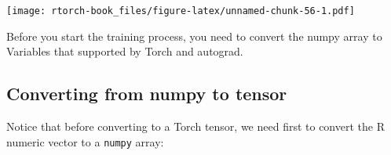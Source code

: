 \documentclass[]{book}
\newenvironment{Shaded}{\begin{snugshade}}{\end{snugshade}}
\newcommand{\CommentTok}[1]{\textcolor[rgb]{0.56,0.35,0.01}{\textit{#1}}}
\newcommand{\KeywordTok}[1]{\textcolor[rgb]{0.13,0.29,0.53}{\textbf{#1}}}
\newcommand{\NormalTok}[1]{#1}
\newcommand{\OperatorTok}[1]{\textcolor[rgb]{0.81,0.36,0.00}{\textbf{#1}}}
\newcommand{\StringTok}[1]{\textcolor[rgb]{0.31,0.60,0.02}{#1}}
\begin{document}
\texttt{[image: rtorch-book\_files/figure-latex/unnamed-chunk-56-1.pdf]}

Before you start the training process, you need to convert the numpy array to Variables that supported by Torch and autograd.

\hypertarget{converting-from-numpy-to-tensor}{%
\subsection{Converting from numpy to tensor}\label{converting-from-numpy-to-tensor}}

Notice that before converting to a Torch tensor, we need first to convert the R numeric vector to a \texttt{numpy} array:

\begin{Shaded}
\end{Shaded}
\end{document}
